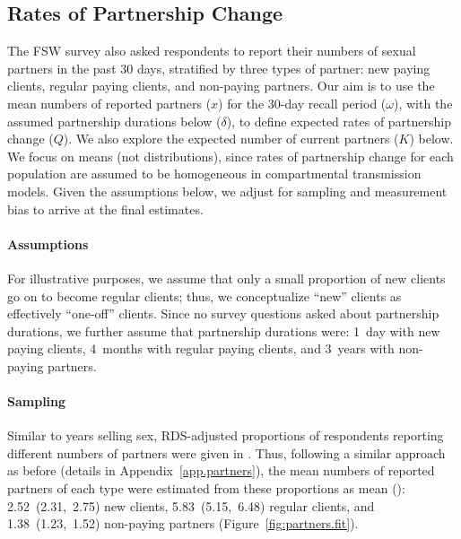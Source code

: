 \subsection{Rates of Partnership Change}\label{meth.partners}
The FSW survey \cite{Baral2014} also asked respondents to report  %
their numbers of sexual partners in the past 30 days,
stratified by three types of partner:
new paying clients, regular paying clients, and non-paying partners.
Our aim is to use the mean numbers of reported partners ($x$) %
for the 30-day recall period ($\omega$),
with the assumed partnership durations below ($\delta$),
to define expected rates of partnership change ($Q$).
We also explore the expected number of current partners ($K$) below. %
We focus on means (not distributions), since
rates of partnership change for each population are assumed to be
homogeneous in compartmental transmission models. %
Given the assumptions below, we adjust for sampling and measurement bias
to arrive at the final estimates.
\paragraph{Assumptions}
For illustrative purposes, we assume that
only a small proportion of new clients go on to become regular clients;
thus, we conceptualize ``new'' clients as effectively ``one-off'' clients.
Since no survey questions asked about partnership durations,
we further assume that partnership durations were:
1~day with new paying clients,
4~months with regular paying clients, and
3~years with non-paying partners.
\paragraph{Sampling}
Similar to years selling sex,
RDS-adjusted proportions of respondents reporting different numbers of partners
were given in \cite{Baral2014}.
Thus, following a similar approach as before (details in Appendix~\ref{app.partners}),
the mean numbers of reported partners of each type
were estimated from these proportions as mean (\ci):
2.52~(2.31,~2.75) new clients,
5.83~(5.15,~6.48) regular clients, and
1.38~(1.23,~1.52) non-paying partners
(Figure~\ref{fig:partners.fit}).

